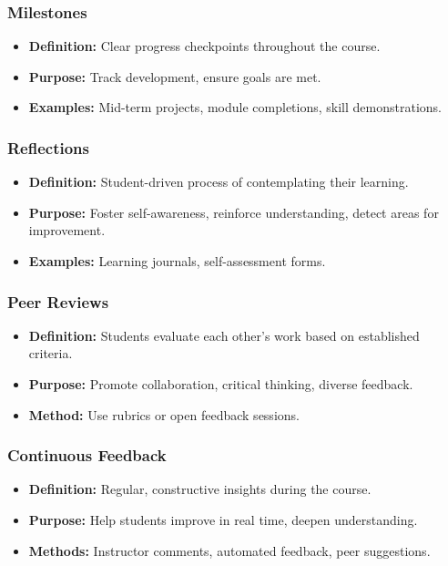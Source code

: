 \documentclass{beamer}
\begin{document}
\begin{frame}[fragile]
\frametitle{Milestones}
\begin{itemize}
  \item \textbf{Definition:} Clear progress checkpoints throughout the course.
  \item \textbf{Purpose:} Track development, ensure goals are met.
  \item \textbf{Examples:} Mid-term projects, module completions, skill demonstrations.
\end{itemize}
\end{frame}

\begin{frame}[fragile]
\frametitle{Reflections}
\begin{itemize}
  \item \textbf{Definition:} Student-driven process of contemplating their learning.
  \item \textbf{Purpose:} Foster self-awareness, reinforce understanding, detect areas for improvement.
  \item \textbf{Examples:} Learning journals, self-assessment forms.
\end{itemize}
\end{frame}

\begin{frame}[fragile]
\frametitle{Peer Reviews}
\begin{itemize}
  \item \textbf{Definition:} Students evaluate each other's work based on established criteria.
  \item \textbf{Purpose:} Promote collaboration, critical thinking, diverse feedback.
  \item \textbf{Method:} Use rubrics or open feedback sessions.
\end{itemize}
\end{frame}

\begin{frame}[fragile]
\frametitle{Continuous Feedback}
\begin{itemize}
  \item \textbf{Definition:} Regular, constructive insights during the course.
  \item \textbf{Purpose:} Help students improve in real time, deepen understanding.
  \item \textbf{Methods:} Instructor comments, automated feedback, peer suggestions.
\end{itemize}
\end{frame}
\end{document}
